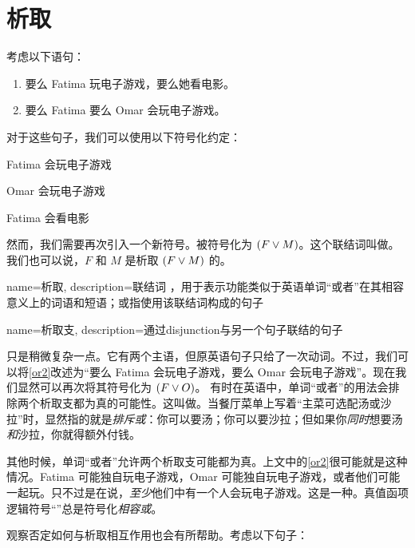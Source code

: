 \section{析取}

考虑以下语句：


\begin{enumerate}
		\item\label{or1}要么 Fatima 玩电子游戏，要么她看电影。
		\item\label{or2}要么 Fatima 要么 Omar 会玩电子游戏。
	\end{enumerate}


对于这些句子，我们可以使用以下符号化约定：


\begin{ekey}
		\item[F] Fatima 会玩电子游戏
		\item[O] Omar 会玩电子游戏
		\item[M] Fatima 会看电影
	\end{ekey}

然而，我们需要再次引入一个新符号。被符号化为 $(F \vee M)$。这个联结词叫做。我们也可以说，$F$ 和 $M$ 是析取 $(F \vee M)$ 的。

{
name=析取,
description={联结词 \eor，用于表示功能类似于英语单词“或者”在其相容意义上的词语和短语；或指使用该联结词构成的句子}
}

{
name=析取支,
description={通过\gls{disjunction}与另一个句子联结的句子}
}

只是稍微复杂一点。它有两个主语，但原英语句子只给了一次动词。不过，我们可以将\cref*{or2}改述为“要么 Fatima 会玩电子游戏，要么 Omar 会玩电子游戏”。现在我们显然可以再次将其符号化为 $(F \vee O)$。
有时在英语中，单词“或者”的用法会排除两个析取支都为真的可能性。这叫做。当餐厅菜单上写着“主菜可选配汤或沙拉”时，显然指的就是\emph{排斥或}：你可以要汤；你可以要沙拉；但如果你\emph{同时}想要汤\emph{和}沙拉，你就得额外付钱。

其他时候，单词“或者”允许两个析取支可能都为真。上文中的\cref{or2}很可能就是这种情况。Fatima 可能独自玩电子游戏，Omar 可能独自玩电子游戏，或者他们可能一起玩。只不过是在说，\emph{至少}他们中有一个人会玩电子游戏。这是一种。真值函项逻辑符号“\eor”总是符号化\emph{相容或}。

观察否定如何与析取相互作用也会有所帮助。考虑以下句子：

